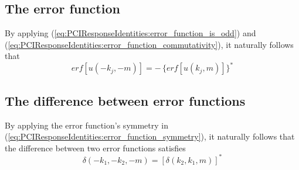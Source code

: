 \subsection{The error function}
By applying (\ref{eq:PCIResponseIdentities:error_function_is_odd}) and
(\ref{eq:PCIResponseIdentities:error_function_commutativity}),
it naturally follows that
\begin{equation}
  erf[u(-k_j, -m)] = - \, \{ erf[u(k_j, m)] \}^*
  \label{eq:PCIResponseIdentities:error_function_symmetry}
\end{equation}


\subsection{The difference between error functions}
By applying the error function's symmetry in
(\ref{eq:PCIResponseIdentities:error_function_symmetry}),
it naturally follows that
the difference between two error functions satisfies
\begin{equation}
  \delta(-k_1, -k_2, -m)
  =
  [\delta(k_2, k_1, m)]^*
  \label{eq:PCIResponseIdentities:difference_of_error_functions_symmetry}
\end{equation}


